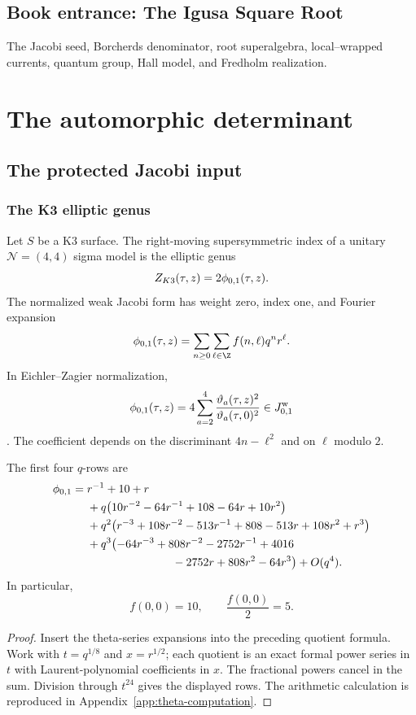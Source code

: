 \cleardoublepage
{}
{}
\chapter*{Book entrance: The Igusa Square Root}
\begin{summarybox}
The Jacobi seed, Borcherds denominator, root superalgebra, local--wrapped currents, quantum group, Hall model, and Fredholm realization.
\end{summarybox}
\part{The automorphic determinant}

\chapter{The protected Jacobi input}
\section{The K3 elliptic genus}
Let $S$ be a K3 surface. The right-moving supersymmetric index of a unitary $\mathcal N=(4,4)$ sigma model is the elliptic genus
\[
 Z_{K3}(\tau,z)=2{\phi_{0,1}}(\tau,z).
\]
The normalized weak Jacobi form has weight zero, index one, and Fourier expansion
\[
 \phiweak(\tau,z)=\sum_{n\ge0}\sum_{\ell\in\Z}f(n,\ell)q^nr^\ell.
\]
In Eichler--Zagier normalization,
\[
 {\phi_{0,1}}(\tau,z)=4\sum_{a=2}^{4}
 \frac{\vartheta_a(\tau,z)^2}{\vartheta_a(\tau,0)^2}
 \in J^{\mathrm w}_{0,1}
\]
\cite{EZ}. The coefficient depends on the discriminant $4n-\ell^2$ and on $\ell$ modulo $2$.

\begin{theorem}
The first four $q$-rows are
\[
\begin{aligned}
{\phi_{0,1}}={}&r^{-1}+10+r\\
&+q\bigl(10r^{-2}-64r^{-1}+108-64r+10r^2\bigr)\\
&+q^2\bigl(r^{-3}+108r^{-2}-513r^{-1}+808-513r+108r^2+r^3\bigr)\\
&+q^3\bigl(-64r^{-3}+808r^{-2}-2752r^{-1}+4016\\
&\hspace{7.5em}{}-2752r+808r^2-64r^3\bigr)+O(q^4).
\end{aligned}
\]
In particular,
\[
 f(0,0)=10,
 \qquad \frac{f(0,0)}2=5.
\]
\end{theorem}
\begin{proof}
Insert the theta-series expansions into the preceding quotient formula. Work with $t=q^{1/8}$ and $x=r^{1/2}$; each quotient is an exact formal power series in $t$ with Laurent-polynomial coefficients in $x$. The fractional powers cancel in the sum. Division through $t^{24}$ gives the displayed rows. The arithmetic calculation is reproduced in Appendix~\ref{app:theta-computation}.
\end{proof}

